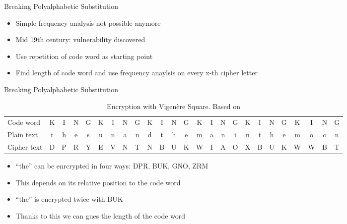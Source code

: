 \documentclass[]{beamer}
\begin{document}
\begin{frame}{Breaking Polyalphabetic Substitution}
	\begin{itemize}
		\item<1-> Simple frequency analysis not possible anymore
		\item<2-> Mid 19th century: vulnerability discovered
		\item<3-> Use repetition of code word as starting point
		\item<4-> Find length of code word and use frequency anaylsis on every x-th cipher letter
	\end{itemize}
\end{frame}

\begin{frame}{Breaking Polyalphabetic Substitution}
	\begin{table}
		\centering
		\resizebox{10.5cm}{!} {
			\begin{tabular}{l c c c c c c c c c c c c c c c c c c c c c c c c}
				\hline
				Code word &K&I&N&G&K&I&N&G&K&I&N&G&K&I&N&G&K&I&N&G&K&I&N&G\\
				Plain text &t&h&e&s&u&n&a&n&d&t&h&e&m&a&n&i&n&t&h&e&m&o&o&n \\
				Cipher text &D&P&R&Y&E&V&N&T&N&B&U&K&W&I&A&O&X&B&U&K&W&W&B&T\\
				\hline
			\end{tabular}
		}
		\caption{Encryption with Vigenère Square. Based on \cite{singh1999}}
	\end{table}
	\begin{itemize}
		\item<2-> ``the'' can be enrcrypted in four ways: DPR, BUK, GNO, ZRM
		\item<4-> This depends on its relative position to the code word
		\item<5-> ``the'' is encrypted twice with BUK
		\item<6-> Thanks to this we can gues the length of the code word
	\end{itemize}
\end{frame}
\end{document}
